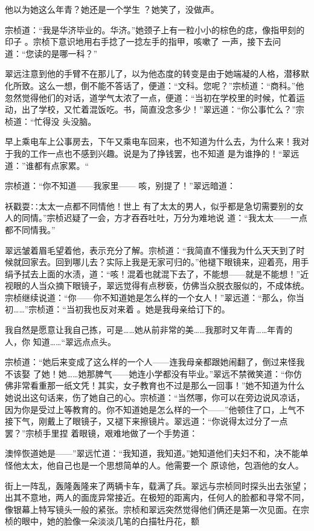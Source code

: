 \documentclass{article}
\begin{document}
    他以为她这么年青？她还是一个学生
？她笑了，没做声。 

    宗桢道：“我是华济毕业的。华济。”她颈子上有一粒小小的棕色的痣，像指甲刻的印子
\newpage
。宗桢下意识地用右手捻了一捻左手的指甲，咳嗽了
一声，接下去问道：“您读的是哪一科？” 

    翠远注意到他的手臂不在那儿了，以为他态度的转变是由于她端凝的人格，潜移默化所致。这么一想，倒不能不答话了，便道：“文科。您呢？”宗桢道：“商科。”他忽然觉得他们的对话，道学气太浓了一点，便道：“当初在学校里的时候，忙着运动，出了学校，又忙着混饭吃。书，简直没念多少！”翠远道：“你公事忙么？”宗桢道：“忙得没
头没脑。 

    早上乘电车上公事房去，下午又乘电车回来，也不知道为什么去，为什么来！我对于我的工作一点也不感到兴趣。说是为了挣钱罢，也不知道
是为谁挣的！“翠远道：”谁都有点家累。“ 

    宗桢道：“你不知道——我家里——
咳，别提了！”翠远暗道： 

    袄戳耍∷太太一点都不同情他！世上
\newpage
有了太太的男人，似乎都是急切需要别的女人的同情。”宗桢迟疑了一会，方才吞吞吐吐，万分为难地说
道：“我太太——一点都不同情我。” 

    翠远皱着眉毛望着他，表示充分了解。宗桢道：“我简直不懂我为什么天天到了时候就回家去。回到哪儿去？实际上我是无家可归的。”他褪下眼镜来，迎着亮，用手绢予拭去上面的水渍，道：“咳！混着也就混下去了，不能想——就是不能想！”近视眼的人当众摘下眼镜子，翠远觉得有点秽亵，仿佛当众脱衣服似的，不成体统。宗桢继续说道：“你——你不知道她是怎么样的一个女人！”翠远道：“那么，你当初……”宗桢道：“当初我也反对来着
。她是我母亲给订下的。 

    我自然是愿意让我自己拣，可是……她从前非常的美……我那时又年青……年青的人，你
知道……“翠远点点头。 

    宗桢道：“她后来变成了这么样的一个人——连我母亲都跟她闹翻了，倒过来怪我不该娶
\newpage
了她！她……她那脾气——她连小学都没有毕业。”翠远不禁微笑道：“你仿佛非常看重那一纸文凭！其实，女子教育也不过是那么一回事！”她不知道为什么她说出这句话来，伤了她自己的心。宗桢道：“当然哪，你可以在旁边说风凉话，因为你是受过上等教育的。你不知道她是怎么样的一个——”他顿住了口，上气不接下气，刚戴上了眼镜子，又褪下来擦镜片。翠远道：“你说得太过分了一点罢？”宗桢手里捏
着眼镜，艰难地做了一个手势道： 

    澳悴恢道她是——”翠远忙道：“我知道，我知道。”她知道他们夫妇不和，决不能单怪他太太，他自己也是一个思想简单的人。他需要一个
原谅他，包涵他的女人。 

    街上一阵乱，轰隆轰隆来了两辆卡车，载满了兵。翠远与宗桢同时探头出去张望；出其不意地，两人的面庞异常接近。在极短的距离内，任何人的脸都和寻常不同，像银幕上特写镜头一般的紧张。宗桢和翠远突然觉得他们俩还是第一次见面。在宗桢的眼中，她的脸像一朵淡淡几笔的白描牡丹花，额
\newpage
\end{document}
